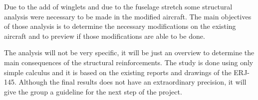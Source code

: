 Due to the add of winglets and due to the fuselage stretch some structural analysis were necessary to be made in the modified aircraft. The main objectives of those analysis is to determine the necessary modifications on the existing aircraft and to preview if those modifications are able to be done.

The analysis will not be very specific, it will be just an overview to determine the main consequences of the structural reinforcements. The study is done using only simple calculus and it is based on the existing reports and drawings of the ERJ-145. Although the final results does not have an extraordinary precision, it will give the group a guideline for the next step of the project.
